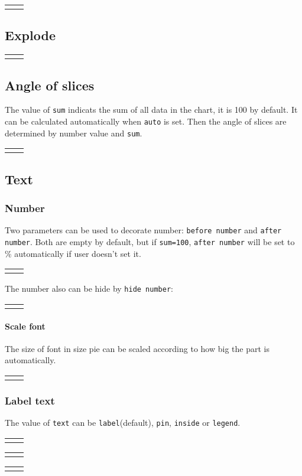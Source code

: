 \documentclass{article}
\newcommand{\demo}[2][1]{
  \begin{center}
  \begin{tabular}{cc}
    \begin{minipage}{.49\linewidth}
      \centering
      \resizebox{#1\linewidth}{!}{
        
      }
    \end{minipage}
    &
    \begin{minipage}{.45\linewidth}
      
    \end{minipage}
  \end{tabular}
  \end{center}
}
\begin{document}
\demo{color}

\subsection{Explode}
\demo{explode}

\subsection{Angle of slices}
The value of \texttt{sum} indicats the sum of all data in the chart,
it is 100 by default. It can be calculated automatically when
\texttt{auto} is set. Then the angle of slices are determined by
number value and \texttt{sum}.

\demo{sum}

\subsection{Text}

\subsubsection{Number}
Two parameters can be used to decorate number: \texttt{before number}
and \texttt{after number}. Both are empty by default, but if
\texttt{sum=100}, \texttt{after number} will be set to \%
automatically if user doesn't set it.

\demo[0.6]{before-after-number}

The number also can be hide by \texttt{hide number}:

\demo[0.6]{hide-number}

\paragraph{Scale font}
The size of font in size pie can be scaled according to how big the
part is automatically.

\demo[0.6]{scalefont}

\subsubsection{Label text}
The value of \texttt{text} can be \texttt{label}(default),
\texttt{pin}, \texttt{inside} or \texttt{legend}.

\demo[0.6]{text}

\demo[0.5]{text-inside}

\demo[0.6]{legend}
\end{document}
